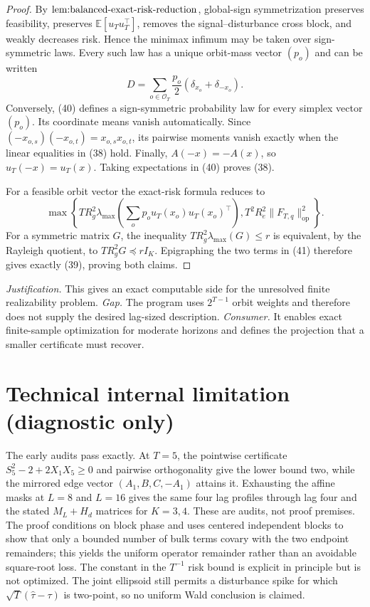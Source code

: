 \documentclass{article}
\begin{document}
\begin{proof}
By \(\textnormal{lem:balanced-exact-risk-reduction}\), global-sign symmetrization preserves feasibility, preserves \(\mathbb E[u_Tu_T^{\top}]\), removes the signal--disturbance cross block, and weakly decreases risk.  Hence the minimax infimum may be taken over sign-symmetric laws.  Every such law has a unique orbit-mass vector \((p_o)\) and can be written
\[
D=\sum_{o\in\mathcal O_T}\frac{p_o}{2}(\delta_{x_o}+\delta_{-x_o}). \tag{40}
\]
Conversely, (40) defines a sign-symmetric probability law for every simplex vector \((p_o)\).  Its coordinate means vanish automatically.  Since \((-x_{o,s})(-x_{o,t})=x_{o,s}x_{o,t}\), its pairwise moments vanish exactly when the linear equalities in (38) hold.  Finally, \(A(-x)=-A(x)\), so \(u_T(-x)=u_T(x)\).  Taking expectations in (40) proves (38).

For a feasible orbit vector the exact-risk formula reduces to
\[
\max\!\left\{TR_g^2\lambda_{\max}\!\left(\sum_op_ou_T(x_o)u_T(x_o)^{\top}\right),
T^2R_e^2\|F_{T,q}\|_{\mathrm{op}}^2\right\}. \tag{41}
\]
For a symmetric matrix \(G\), the inequality \(TR_g^2\lambda_{\max}(G)\le r\) is equivalent, by the Rayleigh quotient, to \(TR_g^2G\preceq rI_K\).  Epigraphing the two terms in (41) therefore gives exactly (39), proving both claims.
\end{proof}
\par\smallskip\noindent \textit{Justification.} This gives an exact computable side for the unresolved finite realizability problem. \textit{Gap.} The program uses \(2^{T-1}\) orbit weights and therefore does not supply the desired lag-sized description. \textit{Consumer.} It enables exact finite-sample optimization for moderate horizons and defines the projection that a smaller certificate must recover.

\section*{Technical internal limitation (diagnostic only)}

The early audits pass exactly. At \(T=5\), the pointwise certificate \(S_5^2-2+2X_1X_5\ge0\) and pairwise orthogonality give the lower bound two, while the mirrored edge vector \((A_1,B,C,-A_1)\) attains it. Exhausting the affine masks at \(L=8\) and \(L=16\) gives the same four lag profiles through lag four and the stated \(M_L+H_d\) matrices for \(K=3,4\). These are audits, not proof premises. The proof conditions on block phase and uses centered independent blocks to show that only a bounded number of bulk terms covary with the two endpoint remainders; this yields the uniform operator remainder rather than an avoidable square-root loss. The constant in the \(T^{-1}\) risk bound is explicit in principle but is not optimized. The joint ellipsoid still permits a disturbance spike for which \(\sqrt T(\widehat\tau-\tau)\) is two-point, so no uniform Wald conclusion is claimed.
\end{document}
